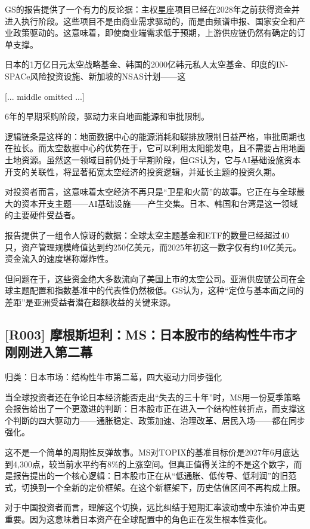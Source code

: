 \documentclass[11pt]{ctexart}
\begin{document}
GS的报告提供了一个有力的反论据：主权星座项目已经在2028年之前获得资金并进入执行阶段。这些项目不是由商业需求驱动的，而是由频谱申报、国家安全和产业政策驱动的。这意味着，即使商业端需求低于预期，上游供应链仍然有确定的订单支撑。

日本的1万亿日元太空战略基金、韩国的2000亿韩元私人太空基金、印度的IN-SPACe风险投资设施、新加坡的NSAS计划——这

[... middle omitted ...]

6年的早期采购阶段，驱动力来自地面能源和审批限制。

逻辑链条是这样的：地面数据中心的能源消耗和碳排放限制日益严格，审批周期也在拉长。而太空数据中心的优势在于，它可以利用太阳能发电，且不需要占用地面土地资源。虽然这一领域目前仍处于早期阶段，但GS认为，它与AI基础设施资本开支的关联性，将显著拓宽太空经济的投资逻辑，并延长主题的投资久期。

对投资者而言，这意味着太空经济不再只是“卫星和火箭”的故事。它正在与全球最大的资本开支主题——AI基础设施——产生交集。日本、韩国和台湾是这一领域的主要硬件受益者。

报告提供了一组令人惊讶的数据：全球太空主题基金和ETF的数量已经超过40只，资产管理规模峰值达到约250亿美元，而2025年初这一数字仅有约10亿美元。资金流入的速度堪称爆炸性。

但问题在于，这些资金绝大多数流向了美国上市的太空公司。亚洲供应链公司在全球主题配置和指数基准中的代表性仍然极低。GS认为，这种“定位与基本面之间的差距”是亚洲受益者潜在超额收益的关键来源。

\subsection{[R003] 摩根斯坦利：MS：日本股市的结构性牛市才刚刚进入第二幕}
{\small\color{refgray}归类：日本市场：结构性牛市第二幕，四大驱动力同步强化}

当全球投资者还在争论日本经济能否走出“失去的三十年”时，MS用一份夏季策略会报告给出了一个更激进的判断：日本股市正在进入一个结构性转折点，而支撑这个判断的四大驱动力——通胀稳定、政策加速、治理改革、居民入场——都在同步强化。

这不是一个简单的周期性反弹故事。MS对TOPIX的基准目标价是2027年6月底达到4,300点，较当前水平约有8\%的上涨空间。但真正值得关注的不是这个数字，而是报告提出的一个核心逻辑：日本股市正在从“低通胀、低传导、低利润”的旧范式，切换到一个全新的定价框架。在这个新框架下，历史估值区间不再构成上限。

对于中国投资者而言，理解这个切换，远比纠结于短期汇率波动或中东油价冲击更重要。因为这意味着日本资产在全球配置中的角色正在发生根本性变化。
\end{document}
